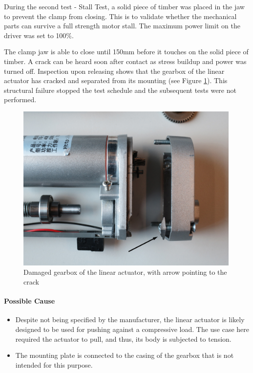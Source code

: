 During the second test - Stall Test, a solid piece of timber was placed in the jaw to prevent the clamp from closing. This is to validate whether the mechanical parts can survive a full strength motor stall. The maximum power limit on the driver was set to 100\%.

The clamp jaw is able to close until 150mm before it touches on the solid piece of timber. A crack can be heard soon after contact as stress buildup and power was turned off. Inspection upon releasing shows that the gearbox of the linear actuator has cracked and separated from its mounting (see Figure \ref{fig:cl1-damaged-gearbox-photo}). This structural failure stopped the test schedule and the subsequent tests were not performed.

\begin{figure}[h]
    \centering
    \includegraphics[width=0.99\textwidth]{images/04-4+5/cl1-damaged-gearbox-witharrow.jpg}
    \caption{Damaged gearbox of the linear actuator, with arrow pointing to the crack}
    \label{fig:cl1-damaged-gearbox-photo}
\end{figure}

\paragraph{Possible Cause}

\begin{itemize}[nosep]
    \item Despite not being specified by the manufacturer, the linear actuator is likely designed to be used for pushing against a compressive load. The use case here required the actuator to pull, and thus, its body is subjected to tension. 
    \item The mounting plate is connected to the casing of the gearbox that is not intended for this purpose.
\end{itemize}

